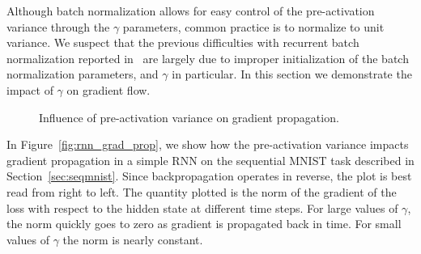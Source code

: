 \documentclass{article} %
\begin{document}
Although batch normalization allows for easy control of the pre-activation
variance through the $\gamma$ parameters, common practice is to normalize to
unit variance.  We suspect that the previous difficulties with recurrent batch
normalization reported in~\citet{cesar,baidu} are largely due to improper
initialization of the batch normalization parameters, and $\gamma$ in
particular.  In this section we demonstrate the impact of $\gamma$ on gradient
flow.


\begin{figure}[!ht]
  \center%
  \hspace{2mm}%
  \caption{
Influence of pre-activation variance on gradient propagation.
}
  \label{fig:variance}
\end{figure}

In Figure~\ref{fig:rnn_grad_prop}, we show how the pre-activation variance
impacts gradient propagation in a simple RNN on the sequential MNIST task
described in Section~\ref{sec:seqmnist}.  Since backpropagation operates in
reverse, the plot is best read from right to left.  The quantity plotted is the
norm of the gradient of the loss with respect to the hidden state at different
time steps.  For large values of $\gamma$, the norm quickly goes to zero as
gradient is propagated back in time.  For small values of $\gamma$ the norm is
nearly constant.
\end{document}
